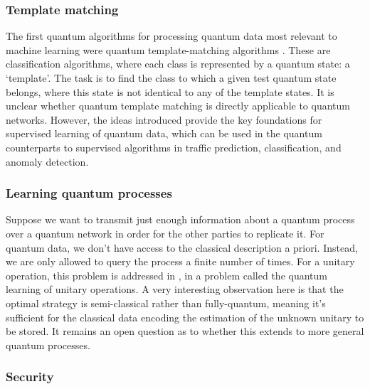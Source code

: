 \documentclass[twocolumn, aps, rmp, amsmath, amssymb, nofootinbib, superscriptaddress, longbibliography, floatfix, table-of-contents, eqsecnum]{revtex4}
\begin{document}
\subsubsection{Template matching}

The first quantum algorithms for processing quantum data most relevant to machine learning were quantum template-matching algorithms \cite{bib:sasaki1, bib:sasaki2}. These are classification algorithms, where each class is represented by a quantum state: a `template'. The task is to find the class to which a given test quantum state belongs, where this state is not identical to any of the template states. It is unclear whether quantum template matching is directly applicable to quantum networks. However, the ideas introduced provide the key foundations for supervised learning of quantum data, which can be used in the quantum counterparts to supervised algorithms in traffic prediction, classification, and anomaly detection.

\subsubsection{Learning quantum processes}

Suppose we want to transmit just enough information about a quantum process over a quantum network in order for the other parties to replicate it. For quantum data, we don't have access to the classical description a priori. Instead, we are only allowed to query the process a finite number of times. For a unitary operation, this problem is addressed in \cite{bib:bisio_optimal_2010}, in a problem called the quantum learning of unitary operations. A very interesting observation here is that the optimal strategy is semi-classical rather than fully-quantum, meaning it's sufficient for the classical data encoding the estimation of the unknown unitary to be stored. It remains an open question as to whether this extends to more general quantum processes.

\subsubsection{Security}
\end{document}
